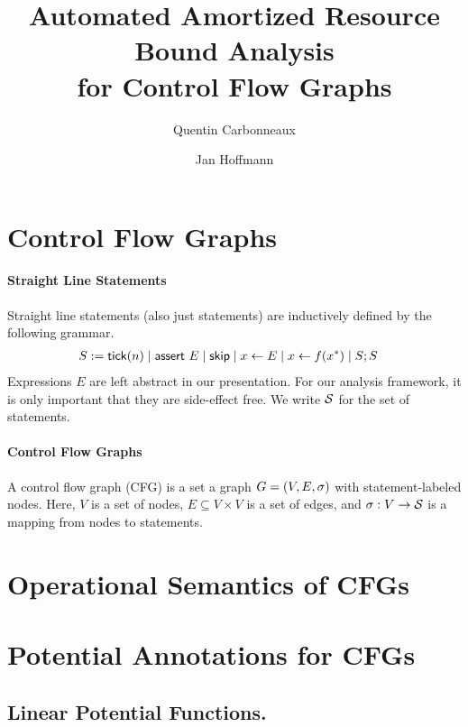\documentclass[letterpaper,11pt]{article}
\title{Automated Amortized Resource Bound Analysis \\ for Control Flow Graphs}
\author{Quentin Carbonneaux \and Jan Hoffmann}
\newcommand{\jan}[1]{{\color{blue}{[Jan: #1]}}}
\begin{document}
\maketitle


\section{Control Flow Graphs}

\paragraph{Straight Line Statements}

Straight line statements (also just statements) are inductively
defined by the following grammar.
%
\begin{align*}
S &:= \mathsf{tick}(n) \mid \mathsf{assert}~E
\mid \mathsf{skip}
\mid x \gets E
\mid x \gets f(x^*)
\mid S;S
\end{align*}
%
Expressions $E$ are left abstract in our presentation.  For our
analysis framework, it is only important that they are side-effect
free. We write $\mathcal{S}$ for the set of statements.

\paragraph{Control Flow Graphs}

A control flow graph (CFG) is a set a graph $G=(V,E,\sigma)$ with
statement-labeled nodes. Here, $V$ is a set of nodes,
$E \subseteq V \times V$ is a set of edges, and
$\sigma : V \to \mathcal{S}$ is a mapping from nodes to statements.

\section{Operational Semantics of CFGs}


\jan{Here we probably need some non-deterministic choice on the
  edges. We have to watch out that this is consistent
  with the assertions that we insert in the blocks. We might have to
  put assertion on the edges to avoid accounting cost for a jump that
  might not happen.}


\section{Potential Annotations for CFGs}

\subsection{Linear Potential Functions.}
\end{document}

